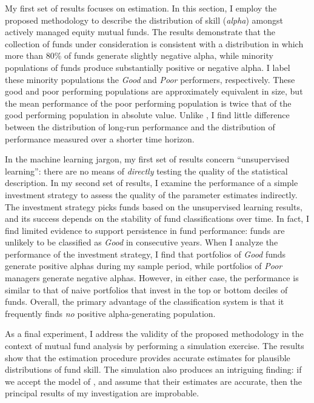 My first set of results focuses on estimation. In this section, I employ the proposed methodology to describe the distribution of skill (\textit{alpha}) amongst actively managed equity mutual funds. The results demonstrate that the collection of funds under consideration is consistent with a distribution in which more than 80\% of funds generate slightly negative alpha, while minority populations of funds produce substantially positive or negative alpha. I label these minority populations the \textit{Good} and \textit{Poor} performers, respectively. These good and poor performing populations are approximately equivalent in size, but the mean performance of the poor performing population is twice that of the good performing population in absolute value. Unlike \citet{Barras2010}, I find little difference between the distribution of long-run performance and the distribution of performance measured over a shorter time horizon.

In the machine learning jargon, my first set of results concern ``unsupervised learning'': there are no means of \textit{directly} testing the quality of the statistical description. In my second set of results, I examine the performance of a simple investment strategy to assess the quality of the parameter estimates indirectly. The investment strategy picks funds based on the unsupervised learning results, and its success depends on the stability of fund classifications over time. In fact, I find limited evidence to support persistence in fund performance: funds are unlikely to be classified as \textit{Good} in consecutive years. When I analyze the performance of the investment strategy, I find that portfolios of \textit{Good} funds generate positive alphas during my sample period, while portfolios of \textit{Poor} managers generate negative alphas. However, in either case, the performance is similar to that of naive portfolios that invest in the top or bottom deciles of funds. Overall, the primary advantage of the classification system is that it frequently finds \textit{no} positive alpha-generating population.

As a final experiment, I address the validity of the proposed methodology in the context of mutual fund analysis by performing a simulation exercise. The results show that the estimation procedure provides accurate estimates for plausible distributions of fund skill. The simulation also produces an intriguing finding: if we accept the model of \citet{Barras2010}, and assume that their estimates are accurate, then the principal results of my investigation are improbable.

